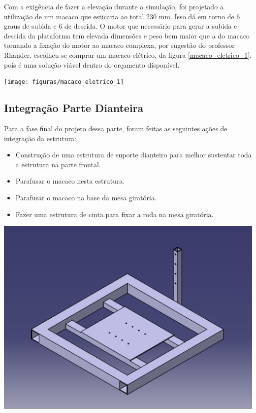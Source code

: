   Com a exigência de fazer a elevação durante a simulação, foi projetado a utilização de um macaco que esticaria ao total 230 mm. Isso dá em torno de 6 graus de subida e 6 de descida. O motor que necessário para gerar a subida e descida da plataforma tem elevada dimensões e peso bem maior que a do macaco tornando a fixação do motor ao macaco complexa, por sugestão do professor Rhander, escolheu-se comprar um macaco elétrico, da figura \ref{macaco_eletrico_1}, pois é uma solução viável dentro do orçamento disponível.

    \begin{center}
        \texttt{[image: figuras/macaco\_eletrico\_1]}
        \label{macaco_eletrico_1}
    \end{center}    

\subsection{Integração Parte Dianteira}
  Para a fase final do projeto dessa parte, foram feitas as seguintes ações de integração da estrutura:
  \begin{itemize}
        \item Construção de uma estrutura de suporte dianteiro para melhor sustentar toda a estrutura na parte frontal.
        \item Parafusar o macaco nesta estrutura.
        \item Parafusar o macaco na base da mesa giratória.
        \item Fazer uma estrutura de cinta para fixar a roda na mesa giratória.
    \end{itemize}
    
    \begin{center}
        \includegraphics[scale=0.5]{figuras/Base_dianteira}
        \label{base_dianteira}
    \end{center}  

